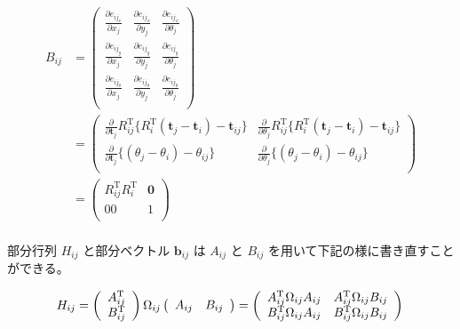 \documentclass{article}
\begin{document}
\[
\begin{align}
B_{ij} &=
\left(
  \begin{array}{ccc}
    \frac{\partial e_{ij_x}}{\partial x_j} & \frac{\partial e_{ij_x}}{\partial y_j} & \frac{\partial e_{ij_x}}{\partial \theta_j} \\
    \frac{\partial e_{ij_y}}{\partial x_j} & \frac{\partial e_{ij_y}}{\partial y_j} & \frac{\partial e_{ij_y}}{\partial \theta_j} \\
    \frac{\partial e_{ij_\theta}}{\partial x_j} & \frac{\partial e_{ij_\theta}}{\partial y_j} & \frac{\partial e_{ij_\theta}}{\partial \theta_j} \\
  \end{array}
\right) \\ &=
\left(
  \begin{array}{ccc}
    \frac{\partial }{\partial \bm{t}_j} R_{ij}^{\mathrm{T}}\{R_i^{\mathrm{T}}(\bm{t}_j-\bm{t}_i)-\bm{t}_{ij}\} & \frac{\partial }{\partial \theta_j} R_{ij}^{\mathrm{T}}\{R_i^{\mathrm{T}}(\bm{t}_j-\bm{t}_i)-\bm{t}_{ij}\} \\
                                         \frac{\partial }{\partial \bm{t}_j} \{(\theta_j - \theta_i) - \theta_{ij}\} & \frac{\partial }{\partial \theta_j} \{(\theta_j - \theta_i) - \theta_{ij}\} \\
  \end{array}
\right) \\ &=
\left(
  \begin{array}{ccc}
    R_{ij}^{\mathrm{T}} R_i^{\mathrm{T}} & \bm{0} \\
                                      00 &      1 \\
  \end{array}
\right) \\
\end{align}
\]

部分行列 $H_{ij}$ と部分ベクトル $\bm{b}_{ij}$ は $A_{ij}$ と $B_{ij}$ を用いて下記の様に書き直すことができる。

\[
H_{ij} =
\left(
  \begin{array}{cc}
    A_{ij}^{\mathrm{T}} \\
    B_{ij}^{\mathrm{T}} \\
  \end{array}
\right)
\Omega_{ij}
\left(
  \begin{array}{cc}
    A_{ij} & B_{ij} \\
  \end{array}
\right) =
\left(
  \begin{array}{cc}
    A_{ij}^{\mathrm{T}}\Omega_{ij}A_{ij} & A_{ij}^{\mathrm{T}}\Omega_{ij}B_{ij} \\
    B_{ij}^{\mathrm{T}}\Omega_{ij}A_{ij} & B_{ij}^{\mathrm{T}}\Omega_{ij}B_{ij} \\
  \end{array}
\right) \\
\]
\end{document}
